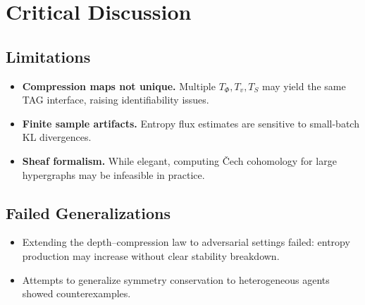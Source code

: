 \documentclass[11pt,a4paper]{article}
\begin{document}
\section{Critical Discussion}
\label{app:limitations}

\subsection{Limitations}
\begin{itemize}
\item \textbf{Compression maps not unique.} Multiple $T_\Phi,T_v,T_S$ may yield the same TAG interface, raising identifiability issues.
\item \textbf{Finite sample artifacts.} Entropy flux estimates are sensitive to small-batch KL divergences.
\item \textbf{Sheaf formalism.} While elegant, computing Čech cohomology for large hypergraphs may be infeasible in practice.
\end{itemize}

\subsection{Failed Generalizations}
\begin{itemize}
\item Extending the depth–compression law to adversarial settings failed: entropy production may increase without clear stability breakdown.
\item Attempts to generalize symmetry conservation to heterogeneous agents showed counterexamples.
\end{itemize}




\end{document}
